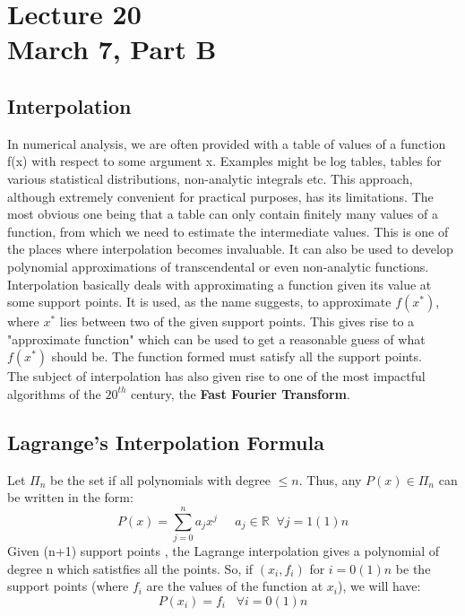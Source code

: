 \chapter*{Lecture 20\\March 7, Part B}
\setcounter{chapter}{4}
\setcounter{section}{0}

\section{Interpolation}

In numerical analysis, we are often provided with a table of values of a function f(x) with respect to some argument x. Examples might be log tables, tables for various statistical distributions, non-analytic integrals etc. This approach, although extremely convenient for practical purposes, has its limitations. The most obvious one being that a table can only contain finitely many values of a function, from which we need to estimate the intermediate values. This is one of the places where interpolation becomes invaluable. It can also be used to develop polynomial approximations of transcendental or even non-analytic functions.\\
Interpolation basically deals with approximating a function given its value at some support points. It is used, as the name suggests, to approximate $f(x^*)$, where $x^*$ lies between two of the given support points. This gives rise to a "approximate function" which can be used to get a reasonable guess of what $f(x^*)$ should be. The function formed must satisfy all the support points.\\
The subject of interpolation has also given rise to one of the most impactful algorithms of the $20^{th}$ century, the \textbf{Fast Fourier Transform}.

\section{Lagrange's Interpolation Formula}
 
Let $\Pi_n$ be the set if all polynomials with degree $\leq n$. Thus, any $P(x) \in \Pi_n$ can be written in the form:
$$P(x) = \sum_{j = 0}^n a_j x^j\;\;\;\;\;a_j \in \mathbb{R}\;\;\forall j= 1(1)n$$
Given (n+1) support points , the Lagrange interpolation gives a polynomial of degree n which satistfies all the points. So, if $(x_i,f_i)$ for $i = 0(1)n$ be the support points (where $f_i$ are the values of the function at $x_i$), we will have:
$$P(x_i) = f_i    \;\;\; \forall i = 0(1)n$$

